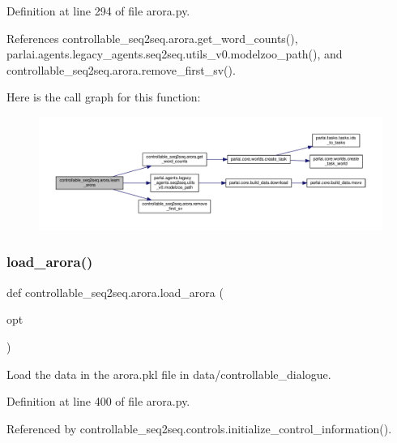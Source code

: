 Definition at line 294 of file arora.\+py.



References controllable\+\_\+seq2seq.\+arora.\+get\+\_\+word\+\_\+counts(), parlai.\+agents.\+legacy\+\_\+agents.\+seq2seq.\+utils\+\_\+v0.\+modelzoo\+\_\+path(), and controllable\+\_\+seq2seq.\+arora.\+remove\+\_\+first\+\_\+sv().

Here is the call graph for this function\+:
\nopagebreak
\begin{figure}[H]
\begin{center}
\leavevmode
\includegraphics[width=350pt]{namespacecontrollable__seq2seq_1_1arora_a02fe047a44dcee074e6157300bd61001_cgraph}
\end{center}
\end{figure}
\mbox{\label{namespacecontrollable__seq2seq_1_1arora_a576d45e4f9888847ff61af471423f47d}} 
\subsubsection{\texorpdfstring{load\+\_\+arora()}{load\_arora()}}
{\footnotesize\ttfamily def controllable\+\_\+seq2seq.\+arora.\+load\+\_\+arora (\begin{DoxyParamCaption}\item[{}]{opt }\end{DoxyParamCaption})}

\begin{DoxyVerb}Load the data in the arora.pkl file in data/controllable_dialogue.
\end{DoxyVerb}
 

Definition at line 400 of file arora.\+py.



Referenced by controllable\+\_\+seq2seq.\+controls.\+initialize\+\_\+control\+\_\+information().

